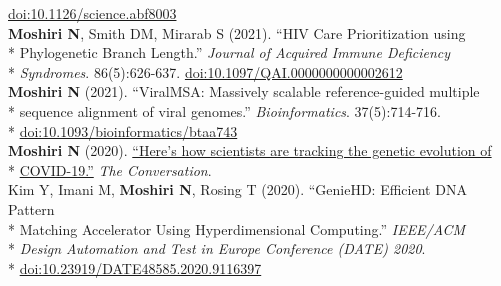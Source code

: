 \documentclass[margin,line]{res}
\begin{document}
\begin{resume}
\hspace*{8mm} \href{https://doi.org/10.1126/science.abf8003}{doi:10.1126/science.abf8003}\\
\hspace*{4mm} \textbf{Moshiri N}, Smith DM, Mirarab S (2021). ``HIV Care Prioritization using\\*
\hspace*{9mm} Phylogenetic Branch Length.'' \textit{Journal of Acquired Immune Deficiency}\\*\vspace{2mm}
\hspace*{8mm} \textit{Syndromes}. 86(5):626-637. \href{https://doi.org/10.1097/QAI.0000000000002612}{doi:10.1097/QAI.0000000000002612}\\
\hspace*{4mm} \textbf{Moshiri N} (2021). ``ViralMSA: Massively scalable reference-guided multiple\\*
\hspace*{9mm} sequence alignment of viral genomes.'' \textit{Bioinformatics}. 37(5):714-716.\\*\vspace{2mm}
\hspace*{8mm} \href{https://doi.org/10.1093/bioinformatics/btaa743}{doi:10.1093/bioinformatics/btaa743}\\
\hspace*{4mm} \textbf{Moshiri N} (2020). \href{https://theconversation.com/heres-how-scientists-are-tracking-the-genetic-evolution-of-covid-19-134201}{``Here's how scientists are tracking the genetic evolution of}\\*\vspace{2mm}
\hspace*{8mm} \href{https://theconversation.com/heres-how-scientists-are-tracking-the-genetic-evolution-of-covid-19-134201}{COVID-19.''} \textit{The Conversation}.\\
\hspace*{4mm} Kim Y, Imani M, \textbf{Moshiri N}, Rosing T (2020). ``GenieHD: Efficient DNA Pattern\\*
\hspace*{9mm}  Matching Accelerator Using Hyperdimensional Computing.'' \textit{IEEE/ACM}\\*
\hspace*{9mm} \textit{Design Automation and Test in Europe Conference (DATE) 2020}.\\*\vspace{2mm}
\hspace*{8mm} \href{https://doi.org/10.23919/DATE48585.2020.9116397}{doi:10.23919/DATE48585.2020.9116397}\\

\end{resume}
\end{document}

